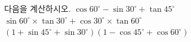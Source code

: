 다음을 계산하시오.
 $\cos 60^\circ-\sin 30^\circ+\tan 45^\circ$
 $\sin 60^\circ\times\tan 30^\circ+\cos 30^\circ\times\tan 60^\circ$
 $(1+\sin 45^\circ+\sin 30^\circ)(1-\cos 45^\circ+\cos 60^\circ)$
